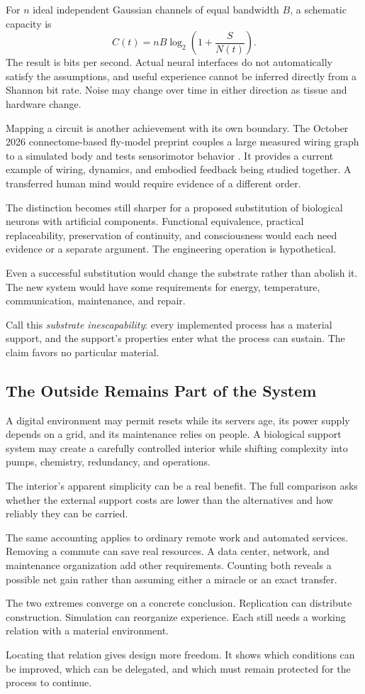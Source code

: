 For $n$ ideal independent Gaussian channels of equal bandwidth $B$, a schematic capacity is
\begin{equation}
 C(t)=nB\log_2\left(1+\frac{S}{N(t)}\right).
\end{equation}
The result is bits per second. Actual neural interfaces do not automatically satisfy the assumptions, and useful experience cannot be inferred directly from a Shannon bit rate. Noise may change over time in either direction as tissue and hardware change.

Mapping a circuit is another achievement with its own boundary. The October 2026 connectome-based fly-model preprint couples a large measured wiring graph to a simulated body and tests sensorimotor behavior \cite{minnick2026sensorimotor}. It provides a current example of wiring, dynamics, and embodied feedback being studied together. A transferred human mind would require evidence of a different order.

The distinction becomes still sharper for a proposed substitution of biological neurons with artificial components. Functional equivalence, practical replaceability, preservation of continuity, and consciousness would each need evidence or a separate argument. The engineering operation is hypothetical.

Even a successful substitution would change the substrate rather than abolish it. The new system would have some requirements for energy, temperature, communication, maintenance, and repair.

Call this \emph{substrate inescapability}: every implemented process has a material support, and the support's properties enter what the process can sustain. The claim favors no particular material.

\subsection{The Outside Remains Part of the System}

A digital environment may permit resets while its servers age, its power supply depends on a grid, and its maintenance relies on people. A biological support system may create a carefully controlled interior while shifting complexity into pumps, chemistry, redundancy, and operations.

The interior's apparent simplicity can be a real benefit. The full comparison asks whether the external support costs are lower than the alternatives and how reliably they can be carried.

The same accounting applies to ordinary remote work and automated services. Removing a commute can save real resources. A data center, network, and maintenance organization add other requirements. Counting both reveals a possible net gain rather than assuming either a miracle or an exact transfer.

The two extremes converge on a concrete conclusion. Replication can distribute construction. Simulation can reorganize experience. Each still needs a working relation with a material environment.

Locating that relation gives design more freedom. It shows which conditions can be improved, which can be delegated, and which must remain protected for the process to continue.
